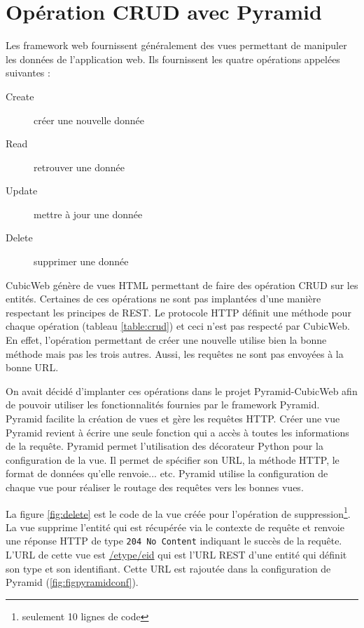 \section{Opération CRUD avec Pyramid}
Les framework web fournissent généralement des vues permettant de manipuler les données de l'application web. Ils fournissent les quatre opérations appelées  suivantes :
\begin{description}
    \item[Create] créer une nouvelle donnée
    \item[Read] retrouver une donnée
    \item[Update] mettre à jour une donnée
    \item[Delete] supprimer une donnée
\end{description}

CubicWeb génère de vues HTML permettant de faire des opération CRUD sur les entités. Certaines de ces opérations ne sont pas implantées d'une manière respectant les principes de REST. Le protocole HTTP définit une méthode pour chaque opération (tableau \ref{table:crud}) et ceci n'est pas respecté par CubicWeb. En effet, l'opération permettant de créer une nouvelle utilise bien la bonne méthode mais pas les trois autres. Aussi, les requêtes ne sont pas envoyées à la bonne URL.

On avait décidé d'implanter ces opérations dans le projet Pyramid-CubicWeb afin de pouvoir utiliser les fonctionnalités fournies par le framework Pyramid. Pyramid facilite la création de vues et gère les requêtes HTTP. Créer une vue Pyramid revient à écrire une seule fonction qui a accès à toutes les informations de la requête. Pyramid permet l'utilisation des décorateur Python pour la configuration de la vue. Il permet de spécifier son URL, la méthode HTTP, le format de données qu'elle renvoie... etc. Pyramid utilise la configuration de chaque vue pour réaliser le routage des requêtes vers les bonnes vues. 

La figure \ref{fig:delete} est le code de la vue créée pour l'opération de suppression\footnote{seulement 10 lignes de code}. La vue supprime l'entité qui est récupérée via le contexte de requête et renvoie une réponse HTTP de type \texttt{204 No Content} indiquant le succès de la requête. L'URL de cette vue est \url{/etype/eid} qui est l'URL REST d'une entité qui définit son type et son identifiant. Cette URL est rajoutée dans la configuration de Pyramid (\ref{fig:figpyramidconf}).

